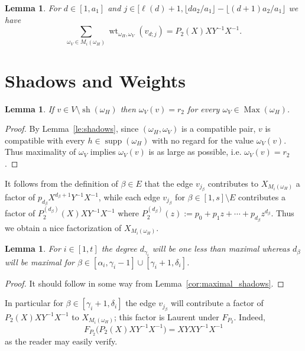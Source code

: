 \documentclass{amsart}
\newtheorem{lemma}[theorem]{Lemma}
\newcommand{\supp}{\operatorname{supp}}
\newcommand{\Max}{\operatorname{Max}}
\newcommand{\sh}{\operatorname{sh}}
\newcommand{\wt}{\operatorname{wt}}
\begin{document}
 \begin{lemma}
  For $d\in[1,a_1]$ and $j\in[\ell(d)+1,\lfloor da_2/a_1\rfloor-\lfloor (d+1)a_2/a_1\rfloor$ we have
  \[\sum\limits_{\omega_V\in M_i(\omega_H)} \wt_{\omega_H,\omega_V}(v_{d;j})=P_2(X)XY^{-1}X^{-1}.\]
 \end{lemma}
 
\section{Shadows and Weights}

 \newpage


 


 \begin{lemma}
  If $v\in V\setminus\sh(\omega_H)$ then $\omega_V(v)=r_2$ for every $\omega_V\in\Max(\omega_H)$.
 \end{lemma}
 \begin{proof}
  By Lemma~\ref{le:shadows}, since $(\omega_H,\omega_V)$ is a compatible pair, $v$ is compatible with every $h\in\supp(\omega_H)$ with no regard for the value $\omega_V(v)$.  Thus maximality of $\omega_V$ implies $\omega_V(v)$ is as large as possible, i.e. $\omega_V(v)=r_2$.
 \end{proof}







 It follows from the definition of $\beta\in E$ that the edge $v_{j_\beta}$ contributes to $X_{M_i(\omega_H)}$ a factor of $p_{d_\beta}X^{d_\beta+1}Y^{-1}X^{-1}$, while each edge $v_{j_\beta}$ for $\beta\in[1,s]\setminus E$ contributes a factor of $P_2^{(d_\beta)}(X)XY^{-1}X^{-1}$ where $P_2^{(d_\beta)}(z):=p_0+p_1z+\cdots+p_{d_\beta}z^{d_\beta}$.  Thus we obtain a nice factorization of $X_{M_i(\omega_H)}$.

 \begin{lemma}\label{le:maximal_degrees}
  For $i\in[1,t]$ the degree $d_{\gamma_i}$ will be one less than maximal whereas $d_\beta$ will be maximal for $\beta\in[\alpha_i,\gamma_i-1]\cup[\gamma_i+1,\delta_i]$.
 \end{lemma}
 \begin{proof}
  It should follow in some way from Lemma~\ref{cor:maximal_shadows}.
 \end{proof}
 In particular for $\beta\in[\gamma_i+1,\delta_i]$ the edge $v_{j_\beta}$ will contribute a factor of $P_2(X)XY^{-1}X^{-1}$ to $X_{M_i(\omega_H)}$; this factor is Laurent under $F_{P_2}$.  Indeed, 
 \[F_{P_2}\big(P_2(X)XY^{-1}X^{-1}\big)=XYXY^{-1}X^{-1}\]
 as the reader may easily verify.
\end{document}
